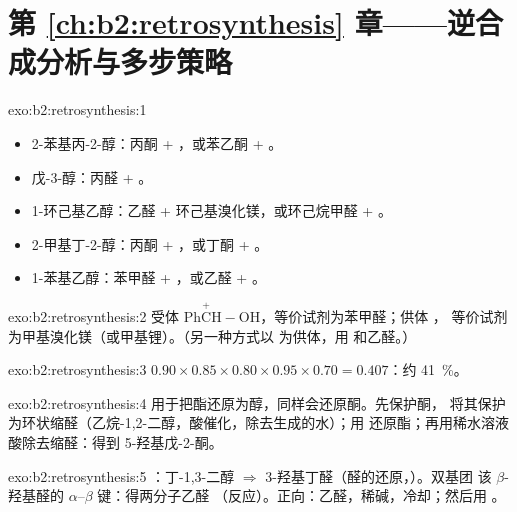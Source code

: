 \section*{第 \ref{ch:b2:retrosynthesis} 章——逆合成分析与多步策略}

\begin{solution}{exo:b2:retrosynthesis:1}
\begin{itemize}
  \item 2-苯基丙-2-醇：丙酮 + ，或苯乙酮 + 。
  \item 戊-3-醇：丙醛 + 。
  \item 1-环己基乙醇：乙醛 + 环己基溴化镁，或环己烷甲醛 +
        。
  \item 2-甲基丁-2-醇：丙酮 + ，或丁酮 + 。
  \item 1-苯基乙醇：苯甲醛 + ，或乙醛 + 。
\end{itemize}
\end{solution}

\begin{solution}{exo:b2:retrosynthesis:2}
受体 $\mathrm{Ph\overset{+}{C}H{-}OH}$，等价试剂为苯甲醛；供体 ，
等价试剂为甲基溴化镁（或甲基锂）。（另一种方式以  为供体，用
 和乙醛。）
\end{solution}

\begin{solution}{exo:b2:retrosynthesis:3}
$0.90 \times 0.85 \times 0.80 \times 0.95 \times 0.70 = 0.407$：约 41~\%。
\end{solution}

\begin{solution}{exo:b2:retrosynthesis:4}
 用于把酯还原为醇，同样会还原酮。先保护酮，
将其保护为环状缩醛（乙烷-1,2-二醇，酸催化，除去生成的水）；用
 还原酯；再用稀水溶液酸除去缩醛：得到 5-羟基戊-2-酮。
\end{solution}

\begin{solution}{exo:b2:retrosynthesis:5}
：丁-1,3-二醇 $\Rightarrow$ 3-羟基丁醛（醛的还原，）。双基团
该 $\beta$-羟基醛的 $\alpha$--$\beta$ 键：得两分子乙醛
（反应）。正向：乙醛，稀碱，冷却；然后用 。
\end{solution}

